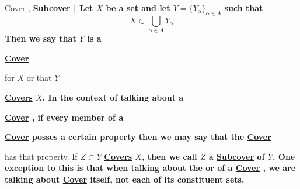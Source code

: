 \label{def:Cover}
\newcommand{\Cover}[0]{
    \bf \hyperref[def:Cover]{Cover} \rm
}
\newcommand{\Covers}[0]{
    \bf \hyperref[def:Cover]{Covers} \rm
}
\newcommand{\Subcover}[0]{
    \bf \hyperref[def:Cover]{Subcover} \rm
}
\newcommand{\Subcovers}[0]{
    \bf \hyperref[def:Cover]{Subcovers} \rm
}
\begin{df}[\Cover, \Subcover]
    Let $X$ be a set and let 
    $Y=\{Y_\alpha\}_{\alpha \in A}$ 
    such that 
    \begin{equation*}
        X \subset \bigcup_{\alpha \in A} Y_{\alpha}
    \end{equation*}
    Then we say that 
    $Y$ 
    is a 
    \Cover
    for $X$ 
    or that $Y$ 
    \Covers $X$. 
    In the context of talking about a 
    \Cover, if every member of a 
    \Cover posses a certain property
    then we may say that the \Cover 
    has that property. 
    If $Z \subset Y$ \Covers $X$, then
    we call $Z$ a \Subcover of $Y$. 
    One exception to this is that 
    when talking about the 
    \Cardinality
    or \Disjointedness 
    of a \Cover, we are 
    talking about \Cover itself, 
    not each of its constituent sets. 
\end{df}
